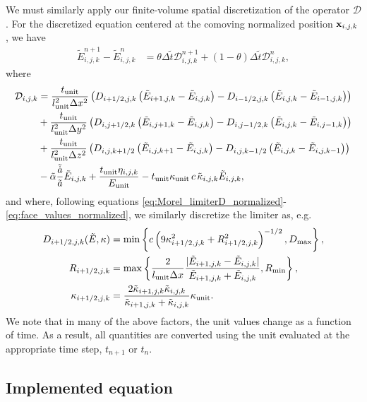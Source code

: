 \documentclass[10pt]{article}
\renewcommand{\(}{\left(}
\renewcommand{\)}{\right)}
\newcommand{\xvec}{{\bf x}}
\newcommand{\adot}{\dot{a}}
\newcommand{\mD}{{\mathcal D}}
\newcommand{\Lunit}{l_{\text{unit}}}
\newcommand{\Tunit}{t_{\text{unit}}}
\newcommand{\Eunit}{E_{\text{unit}}}
\newcommand{\Kunit}{\kappa_{\text{unit}}}
\newcommand{\tK}{\tilde{\kappa}}
\newcommand{\tT}{\tilde{t}}
\newcommand{\tE}{\tilde{E}}
\newcommand{\tA}{\tilde{a}}
\newcommand{\tAdot}{\tilde{\adot}}
\newcommand{\talpha}{\tilde{\alpha}}
\begin{document}
We must similarly apply our finite-volume spatial discretization of
the operator $\mD$.  For the discretized equation centered at the
comoving normalized position $\xvec_{i,j,k}$, we have 
\begin{align}
  \label{eq:mgfld_discrete}
  \tE_{i,j,k}^{n+1} - \tE_{i,j,k}^n &= \theta\Delta \tT \mD_{i,j,k}^{n+1} 
    + (1-\theta)\Delta \tT \mD_{i,j,k}^{n},
\end{align}
where
\begin{align}
  \label{eq:discrete_operator}
  \mD_{i,j,k} &= 
       \frac{\Tunit}{\Lunit^2 \Delta x^2}\(D_{i+1/2,j,k}\(\tE_{i+1,j,k} - \tE_{i,j,k}\) - D_{i-1/2,j,k}\(\tE_{i,j,k} - \tE_{i-1,j,k}\)\) \\
 \notag
    &+ \frac{\Tunit}{\Lunit^2 \Delta y^2}\(D_{i,j+1/2,k}\(\tE_{i,j+1,k} - \tE_{i,j,k}\) - D_{i,j-1/2,k}\(\tE_{i,j,k} - \tE_{i,j-1,k}\)\) \\
  \notag
    &+ \frac{\Tunit}{\Lunit^2 \Delta z^2}\(D_{i,j,k+1/2}\(\tE_{i,j,k+1} - \tE_{i,j,k}\) - D_{i,j,k-1/2}\(\tE_{i,j,k} - \tE_{i,j,k-1}\)\) \\
  \notag
    &- \talpha\frac{\tAdot}{\tA} \tE_{i,j,k} + \frac{\Tunit \eta_{i,j,k}}{\Eunit} 
     - \Tunit \Kunit\, c\, \tK_{i,j,k} \tE_{i,j,k},
\end{align}
and where, following equations
\eqref{eq:Morel_limiterD_normalized}-\eqref{eq:face_values_normalized},
we similarly discretize the limiter as, e.g.
\begin{align}
  \label{eq:discrete_limiter}
  D_{i+1/2,j,k}(\tE,\kappa) &= \min\left\{ c \left(9\kappa_{i+1/2,j,k}^2 + R_{i+1/2,j,k}^2\right)^{-1/2},
    D_\text{max} \right\},\\
  \notag
  R_{i+1/2,j,k} &= \max\left\{\frac{2}{\Lunit \Delta x} \frac{|\tE_{i+1,j,k}-\tE_{i,j,k}|}{\tE_{i+1,j,k}+\tE_{i,j,k}}, R_\text{min} \right\}, \\
  \notag
  \kappa_{i+1/2,j,k} &= \frac{2 \tK_{i+1,j,k} \tK_{i,j,k}}{\tK_{i+1,j,k} + \tK_{i,j,k}}\Kunit.
\end{align}
We note that in many of the above factors, the unit values change
as a function of time.  As a result, all quantities are converted
using the unit evaluated at the appropriate time step, $t_{n+1}$ or
$t_n$.



\subsection{Implemented equation}
\label{sec:fv_implementation}
\end{document}
